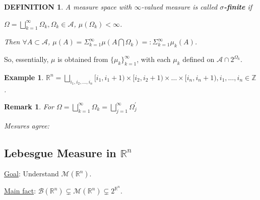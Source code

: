 \documentclass[12pt]{article}
\theoremstyle{blueplain}
\theoremstyle{bluedef}
\newtheorem{definition}{DEFINITION}[section]
\theoremstyle{blueremark}
\newtheorem{remark}{Remark}[section]
\newtheorem{example}{Example}[section]
\newcommand{\R}{\mathbb{R}}
\newcommand{\Z}{\mathbb{Z}}
\numberwithin{equation}{section}
\begin{document}
\begin{definition}
  A measure space with $\infty$-valued measure is called \textbf{$\sigma$-finite} if

  $\Omega = \bigsqcup_{k=1}^{\infty} \Omega_k, \Omega_k \in \mathcal{A}$, $\mu(\Omega_k) < \infty$.

  Then $\forall A \subset \mathcal{A}$, $\mu(A) = \Sigma_{k=1}^{\infty} \mu(A \bigcap \Omega_k) =: \Sigma_{k=1}^{\infty} \mu_k(A)$.
\end{definition}

So, essentially, $\mu$ is obtained from $\{\mu_k\}_{k=1}^{\infty}$, with each $\mu_k$ defined on $\mathcal{A}\cap 2^{\Omega_k}$.









\begin{example}
  $\R^n = \bigsqcup_{i_1, i_2, \ldots, i_n}[i_1, i_1+1) \times [i_2, i_2+1) \times \ldots \times [i_n, i_n+1), i_1, \ldots, i_n \in \Z$.

\end{example}










\begin{remark}
  For $\Omega = \bigsqcup_{k=1}^{\infty} \Omega_k = \bigsqcup_{j=1}^{\infty} \Omega_j^{\prime}$

  Mesures agree:





\end{remark}















\clearpage

\subsection{Lebesgue Measure in $\R^n$}

\underline{Goal}: Understand $\mathcal{M}(\R^n)$.

\underline{Main fact}: $\mathcal{B}(\R^n) \subsetneq \mathcal{M}(\R^n) \subsetneq 2^{\R^n}$.
\end{document}
